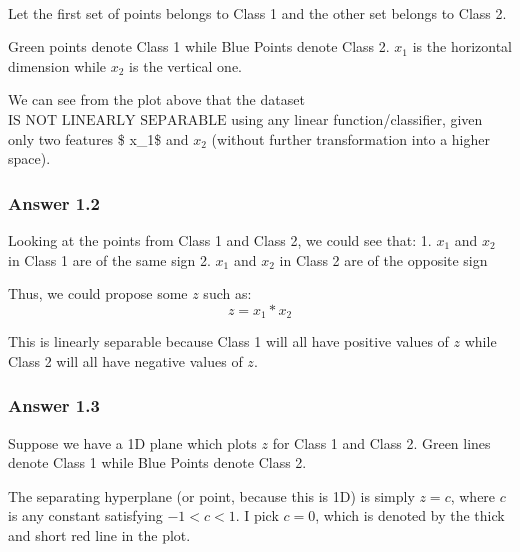 \documentclass[11pt]{article}
\begin{document}
    \begin{center}
    \end{center}
    { \hspace*{\fill} \\}
    
    Let the first set of points belongs to Class 1 and the other set belongs
to Class 2.

Green points denote Class 1 while Blue Points denote Class 2. \(x_1\) is
the horizontal dimension while \(x_2\) is the vertical one.

We can see from the plot above that the dataset
\(\text{IS NOT LINEARLY SEPARABLE}\) using any linear
function/classifier, given only two features \$ x\_1\$ and \(x_2\)
(without further transformation into a higher space).

    \hypertarget{answer-1.2}{%
\subsubsection{Answer 1.2}\label{answer-1.2}}

    Looking at the points from Class 1 and Class 2, we could see that: 1.
\(x_1\) and \(x_2\) in Class 1 are of the same sign 2. \(x_1\) and
\(x_2\) in Class 2 are of the opposite sign

Thus, we could propose some \(z\) such as: \[{z = x_1 * x_2}\]

This is linearly separable because Class 1 will all have positive values
of \(z\) while Class 2 will all have negative values of \(z\).

    \hypertarget{answer-1.3}{%
\subsubsection{Answer 1.3}\label{answer-1.3}}

    Suppose we have a 1D plane which plots \(z\) for Class 1 and Class 2.
Green lines denote Class 1 while Blue Points denote Class 2.

The separating hyperplane (or point, because this is 1D) is simply
\(z=c\), where \(c\) is any constant satisfying \(-1 < c < 1\). I pick
\(c=0\), which is denoted by the thick and short red line in the plot.
\end{document}
